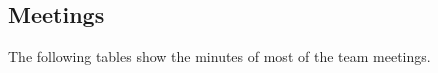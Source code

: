 \begin{appendix}


\chapter{Meetings}\label{ch:Meetings}
The following tables show the minutes of most of the team meetings.

\end{appendix}
